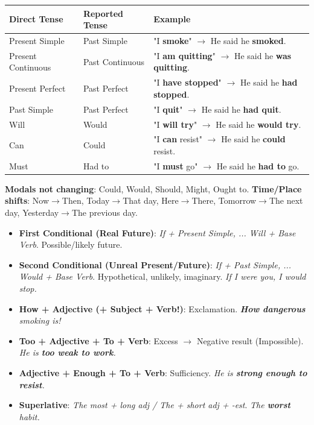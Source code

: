 \documentclass[11pt]{article}
\begin{document}
\begin{bilan}
\begin{center}
\begin{tabularx}{\linewidth}{|l|X|X|}\hline
\rowcolor{popblueL}
\textbf{Direct Tense} & \textbf{Reported Tense} & \textbf{Example} \\ \hline
Present Simple & Past Simple & "I \textbf{smoke}" $\rightarrow$ He said he \textbf{smoked}. \\ \hline
Present Continuous & Past Continuous & "I \textbf{am quitting}" $\rightarrow$ He said he \textbf{was quitting}. \\ \hline
Present Perfect & Past Perfect & "I \textbf{have stopped}" $\rightarrow$ He said he \textbf{had stopped}. \\ \hline
Past Simple & Past Perfect & "I \textbf{quit}" $\rightarrow$ He said he \textbf{had quit}. \\ \hline
Will & Would & "I \textbf{will try}" $\rightarrow$ He said he \textbf{would try}. \\ \hline
Can & Could & "I \textbf{can} resist" $\rightarrow$ He said he \textbf{could} resist. \\ \hline
Must & Had to & "I \textbf{must} go" $\rightarrow$ He said he \textbf{had to} go. \\ \hline
\end{tabularx}
\end{center}
\textbf{Modals not changing}: Could, Would, Should, Might, Ought to.
\textbf{Time/Place shifts}: Now$\rightarrow$Then, Today$\rightarrow$That day, Here$\rightarrow$There, Tomorrow$\rightarrow$The next day, Yesterday$\rightarrow$The previous day.

\begin{definition}
\begin{itemize}
    \item \textbf{First Conditional (Real Future)}: \textit{If + Present Simple, ... Will + Base Verb}. Possible/likely future.
    \item \textbf{Second Conditional (Unreal Present/Future)}: \textit{If + Past Simple, ... Would + Base Verb}. Hypothetical, unlikely, imaginary. \textit{If I were you, I would stop.}
\end{itemize}
\end{definition}

\begin{definition}
\begin{itemize}
    \item \textbf{How + Adjective (+ Subject + Verb!)}: Exclamation. \textit{\textbf{How dangerous} smoking is!}
    \item \textbf{Too + Adjective + To + Verb}: Excess $\rightarrow$ Negative result (Impossible). \textit{He is \textbf{too weak to work}.}
    \item \textbf{Adjective + Enough + To + Verb}: Sufficiency. \textit{He is \textbf{strong enough to resist}.}
    \item \textbf{Superlative}: \textit{The most + long adj / The + short adj + -est}. \textit{The \textbf{worst} habit.}
\end{itemize}
\end{definition}


\end{bilan}
\end{document}
